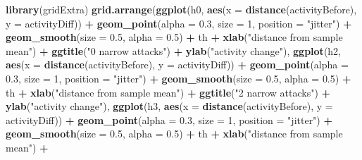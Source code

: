 \documentclass[10pt,]{scrartcl}
\newenvironment{Shaded}{\begin{snugshade}}{\end{snugshade}}
\newcommand{\KeywordTok}[1]{\textcolor[rgb]{0.13,0.29,0.53}{\textbf{#1}}}
\newcommand{\DataTypeTok}[1]{\textcolor[rgb]{0.13,0.29,0.53}{#1}}
\newcommand{\DecValTok}[1]{\textcolor[rgb]{0.00,0.00,0.81}{#1}}
\newcommand{\FloatTok}[1]{\textcolor[rgb]{0.00,0.00,0.81}{#1}}
\newcommand{\StringTok}[1]{\textcolor[rgb]{0.31,0.60,0.02}{#1}}
\newcommand{\OperatorTok}[1]{\textcolor[rgb]{0.81,0.36,0.00}{\textbf{#1}}}
\newcommand{\NormalTok}[1]{#1}
\begin{document}
\begin{Shaded}
\begin{Highlighting}[]
\KeywordTok{library}\NormalTok{(gridExtra)}
\KeywordTok{grid.arrange}\NormalTok{(}\KeywordTok{ggplot}\NormalTok{(h0, }\KeywordTok{aes}\NormalTok{(}\DataTypeTok{x =} \KeywordTok{distance}\NormalTok{(activityBefore), }\DataTypeTok{y =}\NormalTok{ activityDiff)) }\OperatorTok{+}
\StringTok{    }\KeywordTok{geom_point}\NormalTok{(}\DataTypeTok{alpha =} \FloatTok{0.3}\NormalTok{, }\DataTypeTok{size =} \DecValTok{1}\NormalTok{, }\DataTypeTok{position =} \StringTok{"jitter"}\NormalTok{) }\OperatorTok{+}
\StringTok{    }\KeywordTok{geom_smooth}\NormalTok{(}\DataTypeTok{size =} \FloatTok{0.5}\NormalTok{, }\DataTypeTok{alpha =} \FloatTok{0.5}\NormalTok{) }\OperatorTok{+}\StringTok{ }\NormalTok{th }\OperatorTok{+}\StringTok{ }\KeywordTok{xlab}\NormalTok{(}\StringTok{"distance from sample mean"}\NormalTok{) }\OperatorTok{+}
\StringTok{    }\KeywordTok{ggtitle}\NormalTok{(}\StringTok{"0 narrow attacks"}\NormalTok{) }\OperatorTok{+}\StringTok{ }\KeywordTok{ylab}\NormalTok{(}\StringTok{"activity change"}\NormalTok{), }\KeywordTok{ggplot}\NormalTok{(h2,}
    \KeywordTok{aes}\NormalTok{(}\DataTypeTok{x =} \KeywordTok{distance}\NormalTok{(activityBefore), }\DataTypeTok{y =}\NormalTok{ activityDiff)) }\OperatorTok{+}\StringTok{ }\KeywordTok{geom_point}\NormalTok{(}\DataTypeTok{alpha =} \FloatTok{0.3}\NormalTok{,}
    \DataTypeTok{size =} \DecValTok{1}\NormalTok{, }\DataTypeTok{position =} \StringTok{"jitter"}\NormalTok{) }\OperatorTok{+}\StringTok{ }\KeywordTok{geom_smooth}\NormalTok{(}\DataTypeTok{size =} \FloatTok{0.5}\NormalTok{,}
    \DataTypeTok{alpha =} \FloatTok{0.5}\NormalTok{) }\OperatorTok{+}\StringTok{ }\NormalTok{th }\OperatorTok{+}\StringTok{ }\KeywordTok{xlab}\NormalTok{(}\StringTok{"distance from sample mean"}\NormalTok{) }\OperatorTok{+}\StringTok{ }\KeywordTok{ggtitle}\NormalTok{(}\StringTok{"2 narrow attacks"}\NormalTok{) }\OperatorTok{+}
\StringTok{    }\KeywordTok{ylab}\NormalTok{(}\StringTok{"activity change"}\NormalTok{), }\KeywordTok{ggplot}\NormalTok{(h3, }\KeywordTok{aes}\NormalTok{(}\DataTypeTok{x =} \KeywordTok{distance}\NormalTok{(activityBefore),}
    \DataTypeTok{y =}\NormalTok{ activityDiff)) }\OperatorTok{+}\StringTok{ }\KeywordTok{geom_point}\NormalTok{(}\DataTypeTok{alpha =} \FloatTok{0.3}\NormalTok{, }\DataTypeTok{size =} \DecValTok{1}\NormalTok{, }\DataTypeTok{position =} \StringTok{"jitter"}\NormalTok{) }\OperatorTok{+}
\StringTok{    }\KeywordTok{geom_smooth}\NormalTok{(}\DataTypeTok{size =} \FloatTok{0.5}\NormalTok{, }\DataTypeTok{alpha =} \FloatTok{0.5}\NormalTok{) }\OperatorTok{+}\StringTok{ }\NormalTok{th }\OperatorTok{+}\StringTok{ }\KeywordTok{xlab}\NormalTok{(}\StringTok{"distance from sample mean"}\NormalTok{) }\OperatorTok{+}

\end{Highlighting}
\end{Shaded}
\end{document}
